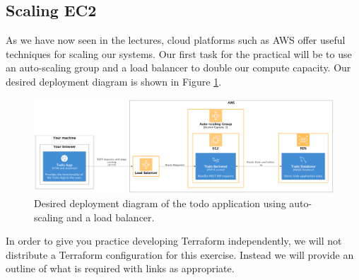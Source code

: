 \documentclass{csse4400}
\begin{document}
\subsection{Scaling EC2}
As we have now seen in the lectures,
cloud platforms such as AWS offer useful techniques for scaling our systems.
Our first task for the practical will be to use an auto-scaling group and a load balancer to double our compute capacity.
Our desired deployment diagram is shown in Figure \ref{fig:scale}.

\begin{figure}[ht]
\includegraphics[width=\textwidth]{diagrams/ScaleDeployment}
\caption{Desired deployment diagram of the todo application using auto-scaling and a load balancer.}
\label{fig:scale}
\end{figure}

In order to give you practice developing Terraform independently,
we will not distribute a Terraform configuration for this exercise.
Instead we will provide an outline of what is required with links as appropriate.
\end{document}
